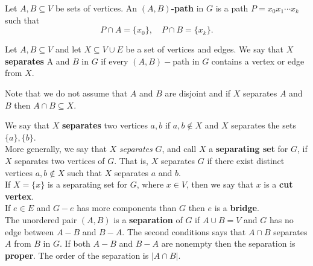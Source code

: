 
Let \(A, B \subseteq V\) be sets of vertices. An \textbf{\((A, B)\)-path} in \(G\) is a path \(P = x_0x_1 \cdots x_k\) such that
\[P \cap A = \{x_0\}, \quad P \cap B = \{x_k\}.\]

Let \(A, B \subseteq V\) and let \(X \subseteq V \cup E\) be a set of vertices and edges. We say that \(X\) \textbf{separates} A and \(B\) in \(G\) if every \((A, B)-\)path in \(G\) contains a vertex or edge from \(X\).

Note that we do not assume that \(A\) and \(B\) are disjoint and if \(X\) separates \(A\) and \(B\) then \(A \cap B \subseteq X\).

We say that \(X\) \textbf{separates} two vertices \(a, b\) if \(a, b \notin X\) and \(X\) separates the sets \(\{a\}, \{b\}\). \\

More generally, we say that \(X\) \textit{separates} \(G\), and call \(X\) a \textbf{separating set} for \(G\), if \(X\) separates two vertices of \(G\). That is, \(X\) separates \(G\) if there exist distinct vertices \(a, b \notin X\) such that \(X\) separates \(a\) and \(b\). \\

If \(X = \{x\}\) is a separating set for \(G\), where \(x \in V\), then we say that \(x\) is a \textbf{cut vertex}. \\

If \(e \in E\) and \(G - e\) has more components than \(G\) then \(e\) is a \textbf{bridge}. \\

The unordered pair \((A, B)\) is a \textbf{separation} of \(G\) if \(A \cup B = V\) and \(G\) has no edge between \(A - B\) and \(B - A\). The second conditions says that \(A \cap B\) separates \(A\) from \(B\) in \(G\). If both \(A - B\) and \(B - A\) are nonempty then the separation is \textbf{proper}. The order of the separation is \(|A \cap B|\).

